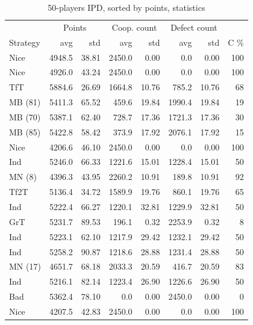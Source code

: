 \documentclass[journal,a4paper,10pt,twoside]{IEEEtran} %
\begin{document}
\begin{table}[ht]
    \caption{50-players IPD, sorted by points, statistics}
    \label{tab:ipdmp}
    \centering
    \begin{tabular}{lrrrrrrr} \toprule
    	         & \multicolumn{2}{c}{Points} & \multicolumn{2}{c}{Coop. count} & \multicolumn{2}{c}{Defect count} & \\
    	Strategy &      avg &   std &      avg &   std &      avg &   std &   C \% \\ \midrule
    	    Nice &   4948.5 & 38.81 &   2450.0 &  0.00 &      0.0 &  0.00 &   100 \\
    	    Nice &   4926.0 & 43.24 &   2450.0 &  0.00 &      0.0 &  0.00 &   100 \\
    	     TfT &   5884.6 & 26.69 &   1664.8 & 10.76 &    785.2 & 10.76 &    68 \\
    	 MB (81) &   5411.3 & 65.52 &    459.6 & 19.84 &   1990.4 & 19.84 &    19 \\
    	 MB (70) &   5387.1 & 62.40 &    728.7 & 17.36 &   1721.3 & 17.36 &    30 \\
    	 MB (85) &   5422.8 & 58.42 &    373.9 & 17.92 &   2076.1 & 17.92 &    15 \\
    	    Nice &   4206.6 & 46.10 &   2450.0 &  0.00 &      0.0 &  0.00 &   100 \\
    	     Ind &   5246.0 & 66.33 &   1221.6 & 15.01 &   1228.4 & 15.01 &    50 \\
    	  MN (8) &   4396.3 & 43.95 &   2260.2 & 10.91 &    189.8 & 10.91 &    92 \\
    	    Tf2T &   5136.4 & 34.72 &   1589.9 & 19.76 &    860.1 & 19.76 &    65 \\
    	     Ind &   5222.4 & 66.27 &   1220.1 & 32.81 &   1229.9 & 32.81 &    50 \\
    	     GrT &   5231.7 & 89.53 &    196.1 &  0.32 &   2253.9 &  0.32 &     8 \\
    	     Ind &   5223.1 & 62.10 &   1217.9 & 29.42 &   1232.1 & 29.42 &    50 \\
    	     Ind &   5258.2 & 90.87 &   1218.6 & 28.88 &   1231.4 & 28.88 &    50 \\
    	 MN (17) &   4651.7 & 68.18 &   2033.3 & 20.59 &    416.7 & 20.59 &    83 \\
    	     Ind &   5216.1 & 82.14 &   1223.4 & 26.90 &   1226.6 & 26.90 &    50 \\
    	     Bad &   5362.4 & 78.10 &      0.0 &  0.00 &   2450.0 &  0.00 &     0 \\
    	    Nice &   4207.5 & 42.83 &   2450.0 &  0.00 &      0.0 &  0.00 &   100 \\

\end{tabular}
\end{table}
\end{document}
